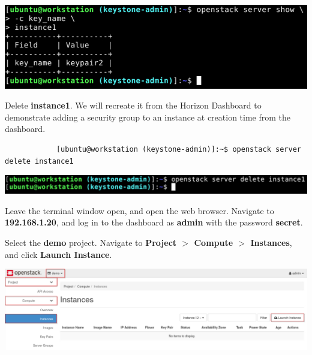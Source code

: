 \documentclass[letterpaper, 12pt]{article}
\begin{document}
\begin{enumerate}
\begin{labstep}
        \begin{center}
            \includegraphics[width=\linewidth]{images/part8/step3.png}
        \end{center}
    \end{labstep}

    \begin{labstep}
        Delete \textbf{instance1}.
        We will recreate it from the Horizon Dashboard to demonstrate adding a security group to an instance at creation time from the dashboard.
        \begin{lstlisting}
            [ubuntu@workstation (keystone-admin)]:~$ openstack server delete instance1
        \end{lstlisting}

        \begin{center}
            \includegraphics[width=\linewidth]{images/part8/step4.png}
        \end{center}
    \end{labstep}

    \begin{labstep}
        Leave the terminal window open, and open the web browser.
        Navigate to \textbf{192.168.1.20}, and log in to the dashboard as \textbf{admin} with the password \textbf{secret}.
    \end{labstep}

    \begin{labstep}
        Select the \textbf{demo} project.
        Navigate to \textbf{Project $>$ Compute $>$ Instances}, and click \textbf{Launch Instance}.

        \begin{center}
            \includegraphics[width=\linewidth]{images/part8/step6.png}
        \end{center}
    \end{labstep}


\end{enumerate}
\end{document}
